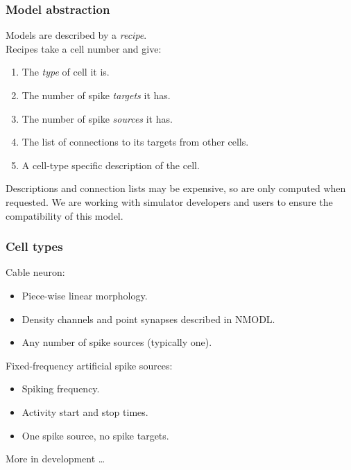 \documentclass[aspectratio=43,12pt]{beamer}
\begin{document}


\begin{frame}
\frametitle{Model abstraction}

Models are described by a \textit{recipe}.\\
\vfill
Recipes take a cell number and give:
\begin{enumerate}
\item The \textit{type} of cell it is.
\item The number of spike \textit{targets} it has.
\item The number of spike \textit{sources} it has.
\item The list of connections to its targets from other cells.
\item A cell-type specific description of the cell.
\end{enumerate}

Descriptions and connection lists may be expensive, so are only
computed when requested.
\vfill
We are working with simulator developers and users to ensure
the compatibility of this model.
\end{frame}

\begin{frame}
\frametitle{Cell types}
Cable neuron:
\begin{itemize}
\item Piece-wise linear morphology.
\item Density channels and point synapses described in NMODL.
\item Any number of spike sources (typically one).
\end{itemize}

\vfill
Fixed-frequency artificial spike sources:
\begin{itemize}
\item Spiking frequency.
\item Activity start and stop times.
\item One spike source, no spike targets.
\end{itemize}

\vfill
More in development \dots
\end{frame}
\end{document}
